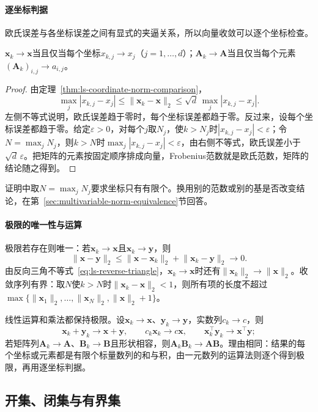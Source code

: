 \paragraph{逐坐标判据}
欧氏误差与各坐标误差之间有显式的夹逼关系，所以向量收敛可以逐个坐标检查。
\begin{theorem}[收敛等价于逐坐标收敛]
\label{thm:multivariable-coordinatewise-convergence}
$\bm x_k\to\bm x$当且仅当每个坐标$x_{k,j}\to x_j$（$j=1,\ldots,d$）；$\bm A_k\to\bm A$当且仅当每个元素$(\bm A_k)_{i,j}\to a_{i,j}$。
\end{theorem}
\begin{proof}
由定理~\ref{thm:ls-coordinate-norm-comparison}，
\[
 \max_j|x_{k,j}-x_j|\leq\lVert\bm x_k-\bm x\rVert_2\leq\sqrt d\,\max_j|x_{k,j}-x_j|.
\]
左侧不等式说明，欧氏误差趋于零时，每个坐标误差都趋于零。反过来，设每个坐标误差都趋于零。给定$\varepsilon>0$，对每个$j$取$N_j$，使$k>N_j$时$|x_{k,j}-x_j|<\varepsilon$；令$N=\max_jN_j$，则$k>N$时$\max_j|x_{k,j}-x_j|<\varepsilon$，由右侧不等式，欧氏误差小于$\sqrt d\,\varepsilon$。把矩阵的元素按固定顺序排成向量，Frobenius范数就是欧氏范数，矩阵的结论随之得到。
\end{proof}
证明中取$N=\max_jN_j$要求坐标只有有限个。换用别的范数或别的基是否改变结论，在第~\ref{sec:multivariable-norm-equivalence}节回答。

\paragraph{极限的唯一性与运算}
极限若存在则唯一：若$\bm x_k\to\bm x$且$\bm x_k\to\bm y$，则
\[
 \lVert\bm x-\bm y\rVert_2\leq\lVert\bm x-\bm x_k\rVert_2+\lVert\bm x_k-\bm y\rVert_2\to0.
\]
由反向三角不等式~\eqref{eq:ls-reverse-triangle}，$\bm x_k\to\bm x$时还有$\lVert\bm x_k\rVert_2\to\lVert\bm x\rVert_2$。收敛序列有界：取$N$使$k>N$时$\lVert\bm x_k-\bm x\rVert_2<1$，则所有项的长度不超过$\max\{\lVert\bm x_1\rVert_2,\ldots,\lVert\bm x_N\rVert_2,\lVert\bm x\rVert_2+1\}$。

线性运算和乘法都保持极限。设$\bm x_k\to\bm x$、$\bm y_k\to\bm y$，实数列$c_k\to c$，则
\[
 \bm x_k+\bm y_k\to\bm x+\bm y,\qquad c_k\bm x_k\to c\bm x,\qquad\bm x_k^\top\bm y_k\to\bm x^\top\bm y;
\]
若矩阵列$\bm A_k\to\bm A$、$\bm B_k\to\bm B$且形状相容，则$\bm A_k\bm B_k\to\bm A\bm B$。理由相同：结果的每个坐标或元素都是有限个标量数列的和与积，由一元数列的运算法则逐个得到极限，再用逐坐标判据。

\subsection{开集、闭集与有界集}
\label{sec:multivariable-open-closed-sets}


